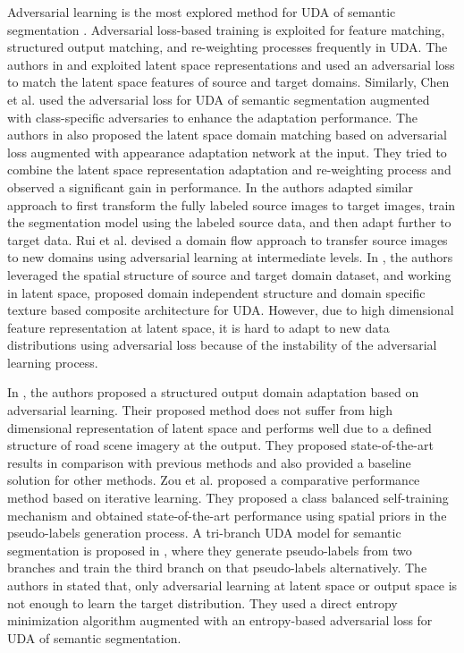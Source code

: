 \documentclass[10pt,twocolumn,letterpaper]{article}
\begin{document}
Adversarial learning is the most explored method for UDA of semantic segmentation \cite{chen2017road, chen2017no, tsai2018learning}. Adversarial loss-based training is exploited for feature matching, structured output matching, and re-weighting processes frequently in UDA. 
The authors in \cite{mancini2018boosting} and \cite{sankaranarayanan2018learning} exploited latent space representations and used an adversarial loss to match the latent space features of source and target domains. Similarly, Chen et al. \cite{chen2017no} used the adversarial loss for UDA of semantic segmentation augmented with class-specific adversaries to enhance the adaptation performance. 
The authors in \cite{zhang2018fully} also proposed the latent space domain matching based on adversarial loss augmented with appearance adaptation network at the input. They tried to combine the latent space representation adaptation and re-weighting process and observed a significant gain in performance. 
In \cite{hoffman2017cycada} the authors adapted similar approach to first transform the fully labeled source images to target images, train the segmentation model using the labeled source data, and then adapt further to target data. Rui et al. \cite{dlow_2019_CVPR} devised a domain flow approach to transfer source images to new domains using adversarial learning at intermediate levels. In \cite{structure_2019_CVPR}, the authors leveraged the spatial structure of source and target domain dataset, and working in latent space, proposed domain independent structure and domain specific texture based composite architecture for UDA.
However, due to high dimensional feature representation at latent space, it is hard to adapt to new data distributions using adversarial loss because of the instability of the adversarial learning process. 


In \cite{tsai2018learning}, the authors proposed a structured output domain adaptation based on adversarial learning. Their proposed method does not suffer from high dimensional representation of latent space and performs well due to a defined structure of road scene imagery at the output. They proposed state-of-the-art results in comparison with previous methods and also provided a baseline solution for other methods.
Zou et al. \cite{zou2018unsupervised} proposed a comparative performance method based on iterative learning. They proposed a class balanced self-training mechanism and obtained state-of-the-art performance using spatial priors in the pseudo-labels generation process. A tri-branch UDA model for semantic segmentation is proposed in \cite{tri2018fully}, where they generate pseudo-labels from two branches and train the third branch on that pseudo-labels alternatively.  
The authors in \cite{vu2019advent} stated that, only adversarial learning at latent space or output space is not enough to learn the target distribution. They used a direct entropy minimization algorithm augmented with an entropy-based adversarial loss for UDA of semantic segmentation.
\end{document}

